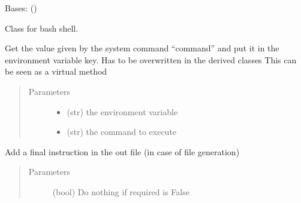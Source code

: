 \documentclass[a4paper,10pt,english]{sphinxmanual}
\begin{document}
\begin{fulllineitems}
\label{\detokenize{apidoc_src/src:src.fileEnviron.BashFileEnviron}}
Bases: {\hyperref[\detokenize{apidoc_src/src:src.fileEnviron.FileEnviron}]{}} ()

Class for bash shell.

\begin{fulllineitems}
\label{\detokenize{apidoc_src/src:src.fileEnviron.BashFileEnviron.command_value}}
Get the value given by the system command “command” 
and put it in the environment variable key.
Has to be overwritten in the derived classes
This can be seen as a virtual method
\begin{quote}\begin{description}
\item[{Parameters}] \leavevmode\begin{itemize}
\item {} 
 \textendash{} (str) the environment variable

\item {} 
 \textendash{} (str) the command to execute

\end{itemize}

\end{description}\end{quote}

\end{fulllineitems}


\begin{fulllineitems}
\label{\detokenize{apidoc_src/src:src.fileEnviron.BashFileEnviron.finish}}
Add a final instruction in the out file (in case of file generation)
\begin{quote}\begin{description}
\item[{Parameters}] \leavevmode
{} \textendash{} (bool) Do nothing if required is False


\end{description}
\end{quote}
\end{fulllineitems}
\end{fulllineitems}
\end{document}

